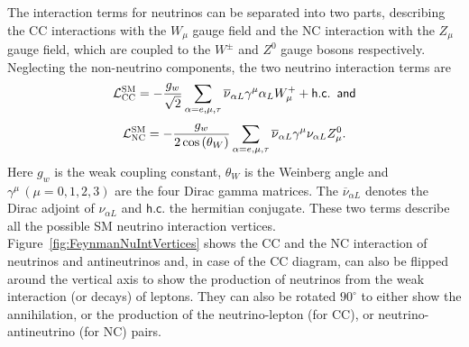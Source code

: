 

The interaction terms for neutrinos can be separated into two parts, describing the \gls{CC} interactions with the $W_\mu$ gauge field and the \gls{NC} interaction with the $Z_\mu$ gauge field, which are coupled to the $W^\pm$ and $Z^0$ gauge bosons respectively. Neglecting the non-neutrino components, the two neutrino interaction terms are \cite{FundamentalsOfNeutrinoPhysics.pdf}
\begin{equation}\label{eq:NuIntCCLagrangian}
\mathcal{L}_{\textsc{CC}}^{\textsc{SM}}=
-\frac{g_w}{\sqrt{2}}\sum_{\alpha=e,\mu,\tau}\overline{\nu}_{\alpha L}\gamma^\mu\alpha_L W_\mu^+ +\textsf{h.c.}\,\,\,\textsf{and}
\end{equation}
\begin{equation}\label{eq:NuIntNCLagrangian}
\mathcal{L}_{\textsc{NC}}^{\textsc{SM}}=
-\frac{g_w}{2\cos\left(\theta_W\right)}\sum_{\alpha=e,\mu,\tau} \overline{\nu}_{\alpha L} \gamma^\mu \nu_{\alpha L} Z_\mu^0.
\end{equation}
Here $g_w$ is the weak coupling constant, $\theta_W$ is the Weinberg angle and $\gamma^\mu\,\left(\mu=0,1,2,3\right)$ are the four Dirac gamma matrices. The $\overline{\nu}_{\alpha L}$ denotes the Dirac adjoint of $\nu_{\alpha L}$ and $\textsf{h.c.}$ the hermitian conjugate. These two terms describe all the possible \gls{SM} neutrino interaction vertices. Figure~\ref{fig:FeynmanNuIntVertices} shows the \gls{CC} and the \gls{NC} interaction of neutrinos and antineutrinos and, in case of the \gls{CC} diagram, can also be flipped around the vertical axis to show the production of neutrinos from the weak interaction (or decays) of leptons. They can also be rotated $90^{\circ}$ to either show the annihilation, or the production of the neutrino-lepton (for \gls{CC}), or neutrino-antineutrino (for \gls{NC}) pairs.


